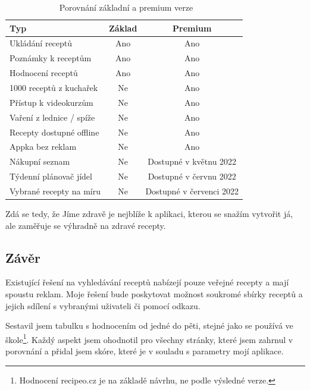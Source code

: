 \begin{table}[H]\centering
\caption{~Porovnání základní a premium verze}\label{tab:jimezdrave:zakladpremium}
\begin{tabular}{l|c|c}
    Typ		                                    & Základ    & Premium   \tabularnewline \hline
    Ukládání receptů		                    & Ano		& Ano       \tabularnewline \hline
    Poznámky k receptům	                        & Ano       & Ano       \tabularnewline \hline
    Hodnocení receptů	                        & Ano		& Ano       \tabularnewline \hline
    1000 receptů z kuchařek	                    & Ne		& Ano       \tabularnewline \hline
    Přístup k videokurzům	                    & Ne		& Ano       \tabularnewline \hline
    Vaření z lednice / spíže                    & Ne        & Ano       \tabularnewline \hline
    Recepty dostupné offline                    & Ne        & Ano       \tabularnewline \hline
    Appka bez reklam                            & Ne        & Ano       \tabularnewline \hline
    Nákupní seznam                              & Ne        & Dostupné v květnu 2022    \tabularnewline \hline
    Týdenní plánovač jídel                      & Ne        & Dostupné v červnu 2022    \tabularnewline \hline
    Vybrané recepty na míru                     & Ne        & Dostupné v červenci 2022  \tabularnewline
\end{tabular}
\end{table}

Zdá se tedy, že Jíme zdravě je nejblíže k aplikaci, kterou se snažím vytvořit já, ale zaměřuje se výhradně na zdravé recepty.

\subsection{Závěr}

Existující řešení na vyhledávání receptů nabízejí pouze veřejné recepty a mají spoustu reklam. Moje řešení bude poskytovat
možnost soukromé sbírky receptů a jejich sdílení s vybranými uživateli či pomocí odkazu.

Sestavil jsem tabulku s hodnocením od jedné do pěti, stejné jako se používá ve škole\footnote{Hodnocení recipeo.cz je na základě návrhu, ne podle výsledné verze.}.
Každý aspekt jsem ohodnotil pro všechny stránky, které jsem zahrnul v porovnání a přidal jsem skóre, které je v souladu s parametry mojí aplikace.

